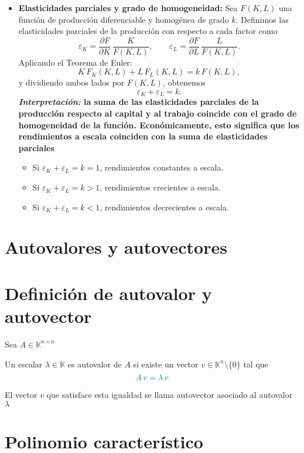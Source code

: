 \documentclass{article}
\begin{document}
\begin{itemize}
  \item \textbf{Elasticidades parciales y grado de homogeneidad:}  
    Sea \(F(K,L)\) una función de producción diferenciable y homogénea de grado \(k\). Definimos las elasticidades parciales de la producción con respecto a cada factor como
    \[
      \varepsilon_K 
      = \frac{\partial F}{\partial K}\,\frac{K}{F(K,L)},
      \qquad
      \varepsilon_L
      = \frac{\partial F}{\partial L}\,\frac{L}{F(K,L)}.
    \]
    Aplicando el Teorema de Euler:
    \[
      K\,F_K(K,L) + L\,F_L(K,L) = k\,F(K,L),
    \]
    y dividiendo ambos lados por \(F(K,L)\), obtenemos
    \[
      \varepsilon_K + \varepsilon_L = k.
    \]
  \textbf{\color{teal}  \emph{Interpretación:} la suma de las elasticidades parciales de la producción respecto al capital y al trabajo coincide con el grado de homogeneidad de la función. Económicamente, esto significa que los rendimientos a escala coinciden con la suma de elasticidades parciales}
    \begin{itemize}
      \item Si \(\varepsilon_K + \varepsilon_L = k = 1\), rendimientos constantes a escala.
      \item Si \(\varepsilon_K + \varepsilon_L = k > 1\), rendimientos crecientes a escala.
      \item Si \(\varepsilon_K + \varepsilon_L = k < 1\), rendimientos decrecientes a escala.
    \end{itemize}


\end{itemize}



\newpage
\section{Autovalores y autovectores}


\section*{Definición de autovalor y autovector}

Sea \(A\in\mathbb{K}^{n\times n}\)

Un escalar \(\lambda\in\mathbb{K}\) es autovalor de \(A\) si existe un vector \(v\in\mathbb{K}^n\setminus\{0\}\) tal que
\[ \color{teal}
A\,v = \lambda\,v
\]

El vector \(v\) que satisface esta igualdad se llama autovector asociado al autovalor \(\lambda\)
\section*{Polinomio característico}
\end{document}
